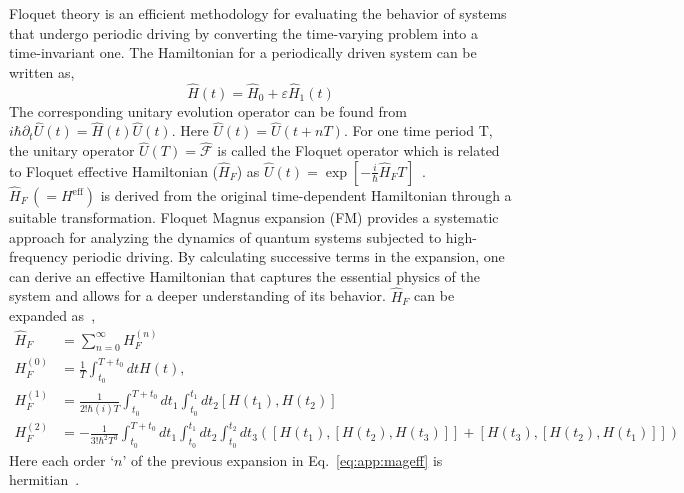 \documentclass[%
reprint,
superscriptaddress,
amsmath,amssymb,showkeys,
aps,
prb,
]{revtex4-2}
\begin{document}
	Floquet theory is an efficient methodology for evaluating the behavior of systems that undergo periodic driving by converting the time-varying problem into a time-invariant one. The Hamiltonian for a periodically driven system can be written as,
	\begin{equation*}
		\hat{H}(t) = \hat{H}_0 + \varepsilon \hat{H}_1(t)
	\end{equation*}
	The corresponding unitary evolution operator can be found from $\displaystyle{i\hbar \partial_t \hat{U}(t) = \hat{H}(t) \hat{U}(t)}$. Here $\displaystyle{\hat{U}(t) = \hat{U}(t+ nT)}$. For one time period T, the unitary operator $\displaystyle \hat{U}(T) = \hat{\mathcal{F}}$ is called the Floquet operator which is related to Floquet effective Hamiltonian ($\hat{H}_F$) as $\hat{U}(t) = \exp[-\frac{i}{\hbar}\hat{H}_F T]$~\cite{Eckardt_2015}. $\hat{H}_F\,(=H^\mathrm{eff})$ is derived from the original time-dependent Hamiltonian through a suitable transformation. Floquet Magnus expansion (FM) provides a systematic approach for analyzing the dynamics of quantum systems subjected to high-frequency periodic driving. By calculating successive terms in the expansion, one can derive an effective Hamiltonian that captures the essential physics of the system and allows for a deeper understanding of its behavior. $\hat{H}_F$ can be expanded as~\cite{Sen_2021},	
	\begin{align}
		\hat{H}_F &= \sum_{n=0}^{\infty} H_F^{(n)}\nonumber\\
		H_F^{(0)} &= \frac{1}{T} \int_{t_0}^{T+t_0} dt H(t), \nonumber\\
		H_F^{(1)} &= \frac{1}{2!\hbar(i)T} \int_{t_0}^{T+t_0} dt_1  \int_{t_0}^{t_1} dt_2 [H(t_1), H(t_2)]\nonumber\\
		H_F^{(2)} &= -\frac{1}{3!\hbar^2 T^3} \int_{t_0}^{T+t_0} dt_1  \int_{t_0}^{t_1} dt_2 \int_{t_0}^{t_2} dt_3([H(t_1),[H(t_2), H(t_3)]] + [H(t_3),[H(t_2), H(t_1)]])
		\label{eq:app:mageff}
	\end{align} 
	Here each order `$n$' of the previous expansion in Eq.~\ref{eq:app:mageff} is hermitian~\cite{haldar_statistical_2022}.
	
\end{document}
